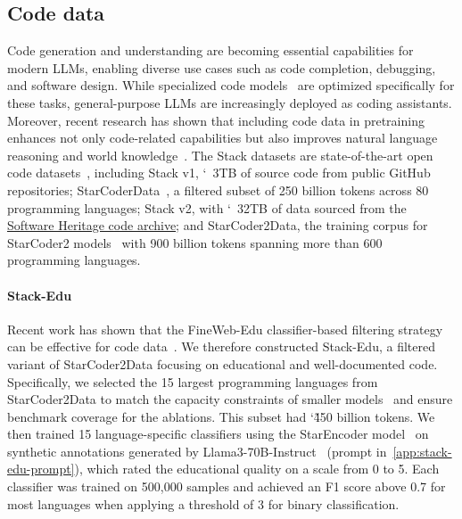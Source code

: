 \documentclass{article}
\theoremstyle{plain}
\theoremstyle{definition}
\theoremstyle{remark}
\begin{document}
\subsection{Code data}
\vspace{-0.15cm} 
\label{sec:code-datasets}
Code generation and understanding are becoming essential capabilities for modern LLMs, enabling diverse use cases such as code completion, debugging, and software design.
While specialized code models~\cite{lozhkov2024starcoder,bai2023qwen,roziere2023code} are optimized specifically for these tasks, general-purpose LLMs are increasingly deployed as coding assistants. Moreover, recent research has shown that including code data in pretraining enhances not only code-related capabilities but also improves natural language reasoning and world knowledge~\cite{aryabumi2024code}.
The Stack datasets are state-of-the-art open code datasets~\cite{li2023starcoder,kocetkov2022stack}, including Stack v1, \char`~3TB of source code from public GitHub repositories; StarCoderData~\cite{li2023starcoder,kocetkov2022stack,lozhkov2024starcoder}, a filtered subset of 250 billion tokens across 80 programming languages; Stack v2, with \char`~32TB of data sourced from the \href{https://www.softwareheritage.org/}{Software Heritage code archive}; and StarCoder2Data, the training corpus for StarCoder2 models~\cite{lozhkov2024starcoder} with 900 billion tokens spanning more than 600 programming languages.

\paragraph{Stack-Edu}
\label{sec:stack-edu}
Recent work has shown that the FineWeb-Edu classifier-based filtering strategy can be effective for code data~\cite{wei2024arctic,allal2024SmolLM}.
We therefore constructed Stack-Edu, a filtered variant of StarCoder2Data focusing on educational and well-documented code. 
Specifically, we selected the 15 largest programming languages from StarCoder2Data to match the capacity constraints of smaller models~\cite{lozhkov2024starcoder} and ensure benchmark coverage for the ablations.
This subset had \char`\~450 billion tokens.
We then trained 15 language-specific classifiers using the StarEncoder model~\cite{li2023starcoder} on synthetic annotations generated by Llama3-70B-Instruct~\cite{dubey2024llama} (prompt in~\cref{app:stack-edu-prompt}), which rated the educational quality on a scale from 0 to 5.
Each classifier was trained on 500,000 samples and achieved an F1 score above 0.7 for most languages when applying a threshold of 3 for binary classification.
\end{document}
